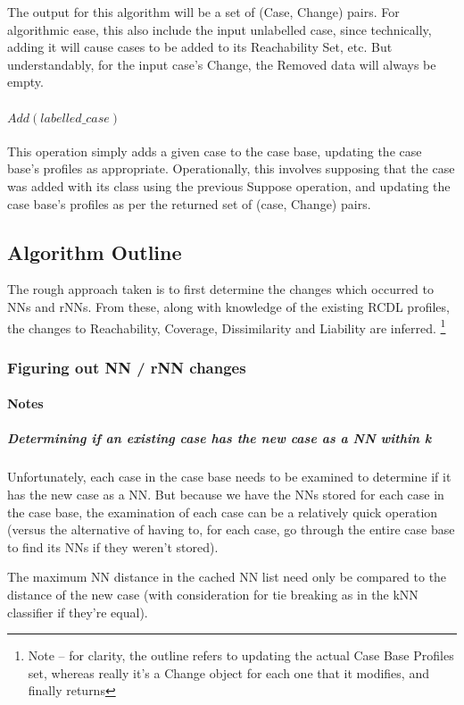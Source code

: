 \documentclass[a4paper,11pt]{report}
\begin{document}
The output for this algorithm will be a set of (Case, Change) pairs. For algorithmic ease, this also include the input unlabelled case, since technically, adding it will cause cases to be added to its Reachability Set, etc. But understandably, for the input case's Change, the Removed data will always be empty.

\paragraph{$Add(labelled\_case)$}
This operation simply adds a given case to the case base, updating the case base's profiles as appropriate. Operationally, this involves supposing that the case was added with its class using the previous Suppose operation, and updating the case base's profiles as per the returned set of (case, Change) pairs.

\subsection{Algorithm Outline}
The rough approach taken is to first determine the changes which occurred to NNs and rNNs. From these, along with knowledge of the existing RCDL profiles, the changes to Reachability, Coverage, Dissimilarity and Liability are inferred. \footnote{Note – for clarity, the outline refers to updating the actual Case Base Profiles set, whereas really it's a Change object for each one that it modifies, and finally returns}

\subsubsection{Figuring out NN / rNN changes}
\paragraph{Notes}
\subparagraph{Determining if an existing case has the new case as a NN within k}
Unfortunately, each case in the case base needs to be examined to determine if it has the new case as a NN. But because we have the NNs stored for each case in the case base, the examination of each case can be a relatively quick operation (versus the alternative of having to, for each case, go through the entire case base to find its NNs if they weren't stored).

The maximum NN distance in the cached NN list need only be compared to the distance of the new case (with consideration for tie breaking as in the kNN classifier if they're equal).
\end{document}
